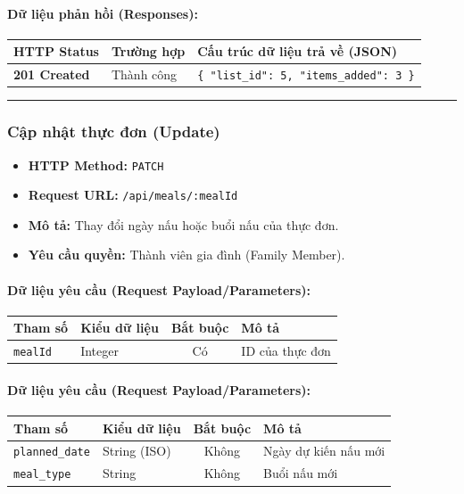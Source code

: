 \documentclass[12pt,a4paper]{article}
\begin{document}
\paragraph{Dữ liệu phản hồi (Responses):}
\begin{longtable}{|p{2.8cm}|p{3.2cm}|p{8.0cm}|}
\hline
\textbf{HTTP Status} & \textbf{Trường hợp} & \textbf{Cấu trúc dữ liệu trả về (JSON)} \\ \hline
\endhead
\textbf{201 Created} & Thành công & \texttt{\{ "list\_id": 5, "items\_added": 3 \}} \\ \hline
\end{longtable}

\vskip 0.4cm
\noindent\rule{\textwidth}{0.3pt}
\vskip 0.4cm

\subsubsection{Cập nhật thực đơn (Update)}
\begin{itemize}[leftmargin=*]
    \item \textbf{HTTP Method:} \texttt{PATCH}
    \item \textbf{Request URL:} \texttt{/api/meals/:mealId}
    \item \textbf{Mô tả:} Thay đổi ngày nấu hoặc buổi nấu của thực đơn.
    \item \textbf{Yêu cầu quyền:} Thành viên gia đình (Family Member).
\end{itemize}

\paragraph{Dữ liệu yêu cầu (Request Payload/Parameters):}
\begin{longtable}{|p{2.8cm}|p{2.2cm}|c|p{7.0cm}|}
\hline
\textbf{Tham số} & \textbf{Kiểu dữ liệu} & \textbf{Bắt buộc} & \textbf{Mô tả} \\ \hline
\endhead
\texttt{mealId} & Integer & Có & ID của thực đơn \\ \hline
\end{longtable}

\paragraph{Dữ liệu yêu cầu (Request Payload/Parameters):}
\begin{longtable}{|p{2.8cm}|p{2.2cm}|c|p{7.0cm}|}
\hline
\textbf{Tham số} & \textbf{Kiểu dữ liệu} & \textbf{Bắt buộc} & \textbf{Mô tả} \\ \hline
\endhead
\texttt{planned\_date} & String (ISO) & Không & Ngày dự kiến nấu mới \\ \hline
\texttt{meal\_type} & String & Không & Buổi nấu mới \\ \hline
\end{longtable}
\end{document}
